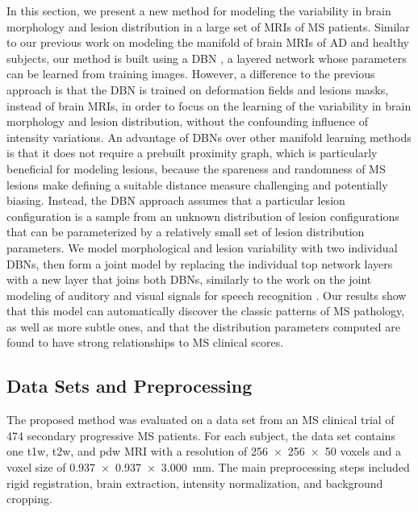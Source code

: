 In this section, we present a new method for modeling the variability in brain
morphology and lesion distribution in a large set of MRIs of MS patients.
Similar to our previous work on modeling the manifold of brain MRIs of AD and
healthy subjects, our method is built using a DBN \citep{hinton2006b}, a layered
network whose parameters can be learned from training images. However, a
difference to the previous approach is that the DBN is trained on deformation
fields and lesions masks, instead of brain MRIs, in order to focus on the
learning of the variability in brain morphology and lesion distribution, without
the confounding influence of intensity variations. An advantage of DBNs over
other manifold learning methods is that it does not require a prebuilt proximity
graph, which is particularly beneficial for modeling lesions, because the
spareness and randomness of MS lesions make defining a suitable distance measure
challenging and potentially biasing. Instead, the DBN approach assumes that a
particular lesion configuration is a sample from an unknown distribution of
lesion configurations that can be parameterized by a relatively small set of
lesion distribution parameters. We model morphological and lesion variability
with two individual DBNs, then form a joint model by replacing the individual
top network layers with a new layer that joins both DBNs, similarly to the work
on the joint modeling of auditory and visual signals for speech recognition
\citep{ngiam2011}. Our results show that this model can automatically discover
the classic patterns of MS pathology, as well as more subtle ones, and that the
distribution parameters computed are found to have strong relationships to MS
clinical scores.


\subsection[Data sets and preprocessing]{Data Sets and Preprocessing}

The proposed method was evaluated on a data set from an MS clinical trial of 474
secondary progressive MS patients. For each subject, the data set contains one
\gls{t1w}, \gls{t2w}, and \gls{pdw} MRI with a resolution of \num{256x256x50}
voxels and a voxel size of \SI{0.937x0.937x3.000}{\milli\meter}. The main
preprocessing steps included rigid registration, brain extraction, intensity
normalization, and background cropping.

